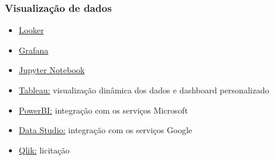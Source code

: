 \subsubsection*{Visualização de dados}
\begin{itemize}
	\item \underline{Looker}
	\item \underline{Grafana}
	\item \underline{Jupyter Notebook} 
	\item \underline{Tableau:} visualização dinâmica dos dados e dashboard personalizado
	\item \underline{PowerBI:} integração com os serviços Microsoft
	\item \underline{Data Studio:} integração com os serviços Google
	\item \underline{Qlik:} licitação 
\end{itemize}
